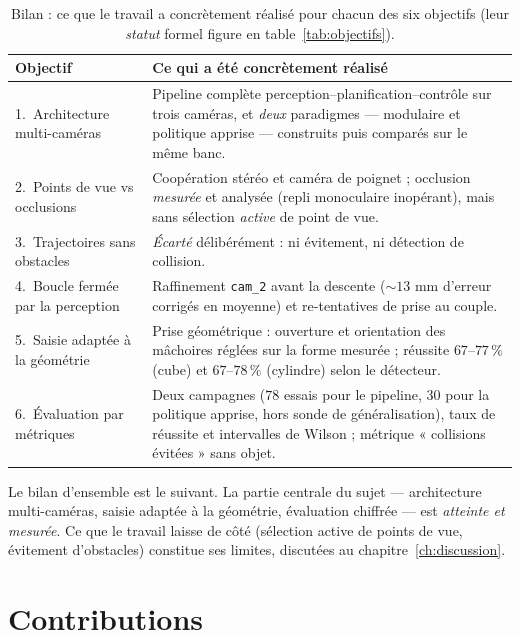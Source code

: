 \begin{table}[H]
\centering
\renewcommand{\arraystretch}{1.3}
\begin{tabularx}{\linewidth}{@{}lX@{}}
\toprule
\textbf{Objectif} & \textbf{Ce qui a été concrètement réalisé} \\
\midrule
1.~Architecture multi-caméras & Pipeline complète perception--planification--contrôle sur trois caméras, et \emph{deux} paradigmes --- modulaire et politique apprise --- construits puis comparés sur le même banc. \\
2.~Points de vue vs occlusions & Coopération stéréo et caméra de poignet ; occlusion \emph{mesurée} et analysée (repli monoculaire inopérant), mais sans sélection \emph{active} de point de vue. \\
3.~Trajectoires sans obstacles & \emph{Écarté} délibérément : ni évitement, ni détection de collision. \\
4.~Boucle fermée par la perception & Raffinement \texttt{cam\_2} avant la descente (${\sim}13$ mm d'erreur corrigés en moyenne) et re-tentatives de prise au couple. \\
5.~Saisie adaptée à la géométrie & Prise géométrique : ouverture et orientation des mâchoires réglées sur la forme mesurée ; réussite $67$--$77\,\%$ (cube) et $67$--$78\,\%$ (cylindre) selon le détecteur. \\
6.~Évaluation par métriques & Deux campagnes ($78$ essais pour le pipeline, $30$ pour la politique apprise, hors sonde de généralisation), taux de réussite et intervalles de Wilson ; métrique « collisions évitées » sans objet. \\
\bottomrule
\end{tabularx}
\caption{Bilan : ce que le travail a concrètement réalisé pour chacun des six objectifs (leur \emph{statut} formel figure en table~\ref{tab:objectifs}).}
\label{tab:bilan}
\end{table}

Le bilan d'ensemble est le suivant. La partie centrale du sujet --- architecture multi-caméras, saisie adaptée à la géométrie, évaluation chiffrée --- est \emph{atteinte et mesurée}. Ce que le travail laisse de côté (sélection active de points de vue, évitement d'obstacles) constitue ses limites, discutées au chapitre~\ref{ch:discussion}.

\section{Contributions}
\label{sec:concl-contrib}

